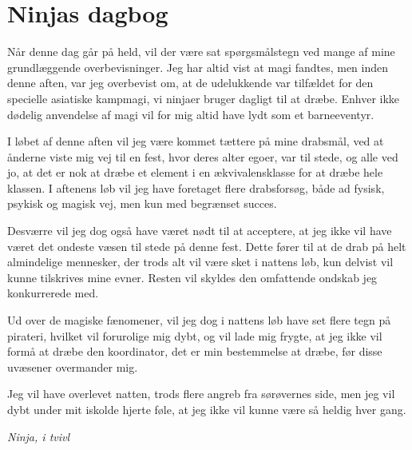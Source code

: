 \begin{minipage}[t]{100mm}
\vspace{3mm}
\section*{Ninjas dagbog}
Når denne dag går på held, vil der være sat spørgsmålstegn ved mange af mine grundlæggende overbevisninger. Jeg har altid vist at magi fandtes, men inden denne aften, var jeg overbevist om, at de udelukkende var tilfældet for den specielle asiatiske kampmagi, vi ninjaer bruger dagligt til at dræbe. Enhver ikke dødelig anvendelse af magi vil for mig altid have lydt som et barneeventyr.

I løbet af denne aften vil jeg være kommet tættere på mine drabsmål, ved at ånderne viste mig vej til en fest, hvor deres alter egoer, var til stede, og alle ved jo, at det er nok at dræbe et element i en ækvivalensklasse for at dræbe hele klassen. I aftenens løb vil jeg have foretaget flere drabsforsøg, både ad fysisk, psykisk og magisk vej, men kun med begrænset succes.

Desværre vil jeg dog også have været nødt til at acceptere, at jeg ikke vil have været det ondeste væsen til stede på denne fest. Dette fører til at de drab på helt almindelige mennesker, der trods alt vil være sket i nattens løb, kun delvist vil kunne tilskrives mine evner. Resten vil skyldes den omfattende ondskab jeg konkurrerede med.

Ud over de magiske fænomener, vil jeg dog i nattens løb have set flere tegn på pirateri, hvilket vil forurolige mig dybt, og vil lade mig frygte, at jeg ikke vil formå at dræbe den koordinator, det er min bestemmelse at dræbe, før disse uvæsener overmander mig.

Jeg vil have overlevet natten, trods flere angreb fra sørøvernes side, men jeg vil dybt under mit iskolde hjerte føle, at jeg ikke vil kunne være så heldig hver gang.

\emph{Ninja, i tvivl}

\end{minipage}

